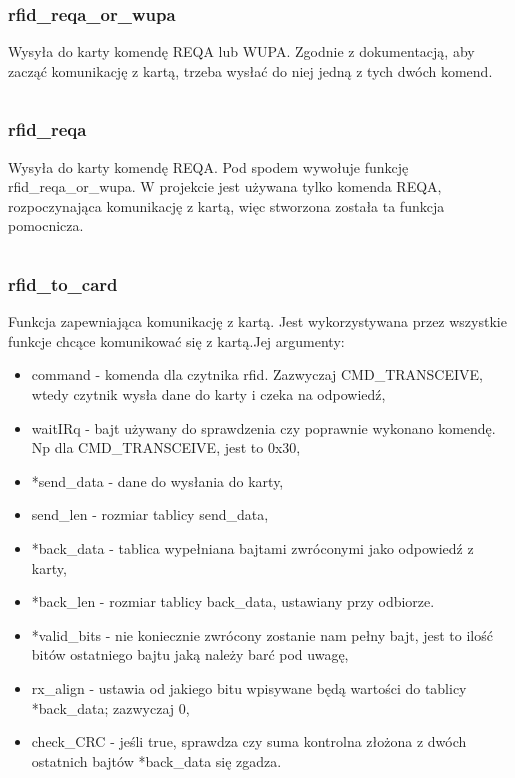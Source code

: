 \documentclass[12pt,hidelinks]{article}
\begin{document}
    \subsubsection{rfid\_reqa\_or\_wupa}
    Wysyła do karty komendę REQA lub WUPA. Zgodnie z dokumentacją, aby zacząć komunikację z kartą, trzeba wysłać do niej jedną z tych dwóch komend.
    \inputminted[linenos=true]{c++}{rfid_code/rfid_reqa_or_wupa.c}

    \subsubsection{rfid\_reqa}
    Wysyła do karty komendę REQA. Pod spodem wywołuje funkcję rfid\_reqa\_or\_wupa. W projekcie jest używana tylko komenda REQA, rozpoczynająca komunikację z kartą, więc stworzona została ta funkcja pomocnicza.
    \inputminted[linenos=true]{c++}{rfid_code/rfid_reqa.c}



    \subsubsection{rfid\_to\_card}
    Funkcja zapewniająca komunikację z kartą. Jest wykorzystywana przez wszystkie funkcje chcące komunikować się z kartą.Jej argumenty:
    \begin{itemize}
        \item command - komenda dla czytnika rfid. Zazwyczaj CMD\_TRANSCEIVE, wtedy czytnik wysła dane do karty i czeka na odpowiedź,
        \item waitIRq - bajt używany do sprawdzenia czy poprawnie wykonano komendę. Np dla CMD\_TRANSCEIVE, jest to 0x30,
        \item *send\_data - dane do wysłania do karty,
        \item send\_len - rozmiar tablicy send\_data,
        \item *back\_data - tablica wypełniana bajtami zwróconymi jako odpowiedź z karty,
        \item *back\_len - rozmiar tablicy back\_data, ustawiany przy odbiorze.
        \item *valid\_bits - nie koniecznie zwrócony zostanie nam pełny bajt, jest to ilość bitów ostatniego bajtu jaką należy barć pod uwagę,
        \item rx\_align - ustawia od jakiego bitu wpisywane będą wartości do tablicy *back\_data; zazwyczaj 0,
        \item check\_CRC - jeśli true, sprawdza czy suma kontrolna złożona z dwóch ostatnich bajtów *back\_data się zgadza.
    \end{itemize}
\end{document}
